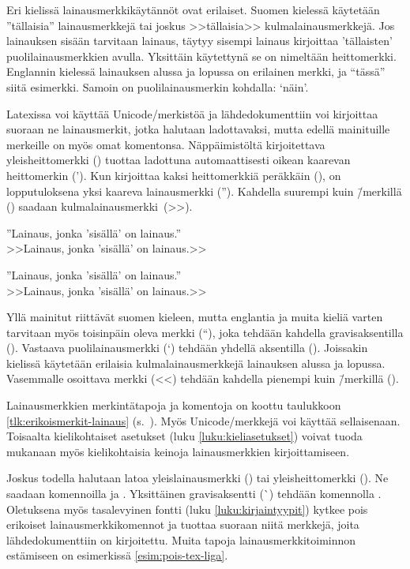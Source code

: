 Eri kielissä lainausmerkkikäytännöt ovat erilaiset. Suomen kielessä
käytetään ''tällaisia'' lainausmerkkejä tai joskus >>tällaisia>>
kulmalainausmerkkejä. Jos lainauksen sisään tarvitaan lainaus, täytyy
sisempi lainaus kirjoittaa 'tällaisten' puolilainausmerkkien avulla.
Yksittäin käytettynä se on nimeltään heittomerkki. Englannin kielessä
lainauksen alussa ja lopussa on erilainen merkki, ja ``tässä'' siitä
esimerkki. Samoin on puolilainausmerkin kohdalla: `näin'.

Latexissa voi käyttää Unicode\-/merkistöä ja lähdedokumenttiin voi
kirjoittaa suoraan ne lainausmerkit, jotka halutaan ladottavaksi, mutta
edellä mainituille merkeille on myös omat komentonsa. Näppäimistöltä
kirjoitettava yleisheittomerkki () tuottaa ladottuna
automaattisesti oikean kaarevan heittomerkin ('). Kun kirjoittaa kaksi
heittomerkkiä peräkkäin (), on lopputuloksena yksi kaareva
lainausmerkki (''). Kahdella suurempi kuin \=/merkillä (\koodi{>>})
saadaan kulmalainausmerkki~(>>).

\pagebreak[3]

\begin{koodilohkosis}
  ''Lainaus, jonka 'sisällä' on lainaus.'' \\
  >>Lainaus, jonka 'sisällä' on lainaus.>>
\end{koodilohkosis}

\begin{tulossis}
  ''Lainaus, jonka 'sisällä' on lainaus.'' \\
  >>Lainaus, jonka 'sisällä' on lainaus.>>
\end{tulossis}

Yllä mainitut riittävät suomen kieleen, mutta englantia ja muita kieliä
varten tarvitaan myös toisinpäin oleva merkki (``), joka tehdään
kahdella gra\-vis\-ak\-sen\-til\-la (). Vastaava
puolilainausmerkki (`) tehdään yhdellä aksentilla (). Joissakin
kielissä käytetään erilaisia kulmalainausmerkkejä lainauksen alussa ja
lopussa. Vasemmalle osoittava merkki (<<) tehdään kahdella pienempi kuin
\=/merkillä (\koodi{<<}).

Lainausmerkkien merkintätapoja ja komentoja on koottu taulukkoon
\ref{tlk:erikoismerkit-lainaus}
(s.~\pageref{tlk:erikoismerkit-lainaus}). Myös Unicode\-/merkkejä voi
käyttää sellaisenaan. Toisaalta kielikohtaiset asetukset (luku
\ref{luku:kieliasetukset}) voivat tuoda mukanaan myös kielikohtaisia
keinoja lainausmerkkien kirjoittamiseen.

Joskus todella halutaan latoa yleislainausmerkki (\textquotedbl) tai
yleisheittomerkki (\textquotesingle). Ne saadaan komennoilla
 ja .
Yksittäinen gra\-vis\-ak\-sent\-ti (\`{}) tehdään komennolla
. Oletuksena myös tasalevyinen fontti (luku
\ref{luku:kirjaintyypit}) kytkee pois erikoiset lainausmerkkikomennot ja
tuottaa suoraan niitä merkkejä, joita lähdedokumenttiin on kirjoitettu.
Muita tapoja lainausmerkkitoiminnon estämiseen on esimerkissä
\ref{esim:pois-tex-liga}.

